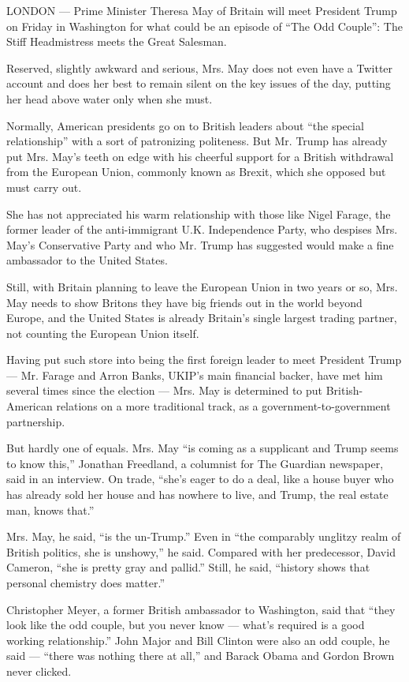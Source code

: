 LONDON --- Prime Minister Theresa May of Britain will meet President
Trump on Friday in Washington for what could be an episode of ``The Odd
Couple'': The Stiff Headmistress meets the Great Salesman.

Reserved, slightly awkward and serious, Mrs. May does not even have a
Twitter account and does her best to remain silent on the key issues of
the day, putting her head above water only when she must.

Normally, American presidents go on to British leaders about ``the
special relationship'' with a sort of patronizing politeness. But Mr.
Trump has already put Mrs. May's teeth on edge with his cheerful support
for a British withdrawal from the European Union, commonly known as
Brexit, which she opposed but must carry out.

She has not appreciated his warm relationship with those like Nigel
Farage, the former leader of the anti-immigrant U.K. Independence Party,
who despises Mrs. May's Conservative Party and who Mr. Trump has
suggested would make a fine ambassador to the United States.

Still, with Britain planning to leave the European Union in two years or
so, Mrs. May needs to show Britons they have big friends out in the
world beyond Europe, and the United States is already Britain's single
largest trading partner, not counting the European Union itself.

Having put such store into being the first foreign leader to meet
President Trump --- Mr. Farage and Arron Banks, UKIP's main financial
backer, have met him several times since the election --- Mrs. May is
determined to put British-American relations on a more traditional
track, as a government-to-government partnership.

But hardly one of equals. Mrs. May ``is coming as a supplicant and Trump
seems to know this,'' Jonathan Freedland, a columnist for The Guardian
newspaper, said in an interview. On trade, ``she's eager to do a deal,
like a house buyer who has already sold her house and has nowhere to
live, and Trump, the real estate man, knows that.''

Mrs. May, he said, ``is the un-Trump.'' Even in ``the comparably
unglitzy realm of British politics, she is unshowy,'' he said. Compared
with her predecessor, David Cameron, ``she is pretty gray and pallid.''
Still, he said, ``history shows that personal chemistry does matter.''

Christopher Meyer, a former British ambassador to Washington, said that
``they look like the odd couple, but you never know --- what's required
is a good working relationship.'' John Major and Bill Clinton were also
an odd couple, he said --- ``there was nothing there at all,'' and
Barack Obama and Gordon Brown never clicked.

